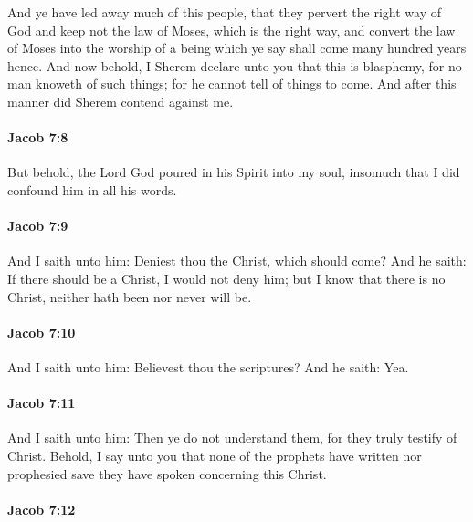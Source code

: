 			And ye have led away much of this people,
			that they pervert the right way of God
			and keep not the law of Moses, which is the right way,
			and convert the law of Moses into the worship of a being
			which ye say shall come many hundred years hence.
			And now behold, I Sherem declare unto you that this is blasphemy,
			for no man knoweth of such things;
			for he cannot tell of things to come.
			And after this manner did Sherem contend against me.

		\paragraph{Jacob 7:8} %
			\label{JACOB-7-8}

			But behold, the Lord God poured in his Spirit into my soul,
			insomuch that I did confound him in all his words.

		\paragraph{Jacob 7:9} %
			\label{JACOB-7-9}

			And I saith unto him:
			Deniest thou the Christ, which should come?
			And he saith:
			If there should be a Christ,
			I would not deny him;
			but I know that there is no Christ,
			neither hath been nor never will be.

		\paragraph{Jacob 7:10} %
			\label{JACOB-7-10}

			And I saith unto him:
			Believest thou the scriptures?
			And he saith: Yea.

		\paragraph{Jacob 7:11} %
			\label{JACOB-7-11}

			And I saith unto him:
			Then ye do not understand them,
			for they truly testify of Christ.
			Behold, I say unto you
			that none of the prophets have written nor prophesied
			save they have spoken concerning this Christ.

		\paragraph{Jacob 7:12} %
			\label{JACOB-7-12}

